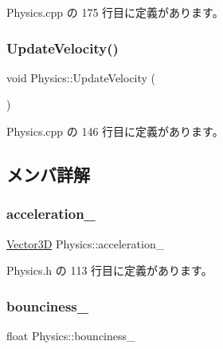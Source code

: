  Physics.\+cpp の 175 行目に定義があります。

\mbox{\label{class_physics_abd74d6413b1fd6c77007edf51ea9db4b}} 
\subsubsection{\texorpdfstring{Update\+Velocity()}{UpdateVelocity()}}
{\footnotesize\ttfamily void Physics\+::\+Update\+Velocity (\begin{DoxyParamCaption}{ }\end{DoxyParamCaption})\hspace{0.3cm}{\ttfamily [private]}}



 Physics.\+cpp の 146 行目に定義があります。



\subsection{メンバ詳解}
\mbox{\label{class_physics_a8e87f3c364d5d0b8d3fb228237f3ff56}} 
\subsubsection{\texorpdfstring{acceleration\+\_\+}{acceleration\_}}
{\footnotesize\ttfamily \mbox{\hyperlink{class_vector3_d}{Vector3D}} Physics\+::acceleration\+\_\+\hspace{0.3cm}{\ttfamily [private]}}



 Physics.\+h の 113 行目に定義があります。

\mbox{\label{class_physics_a302b8ad7552303570fa1cfd070bb8588}} 
\subsubsection{\texorpdfstring{bounciness\+\_\+}{bounciness\_}}
{\footnotesize\ttfamily float Physics\+::bounciness\+\_\+\hspace{0.3cm}{\ttfamily [private]}}



